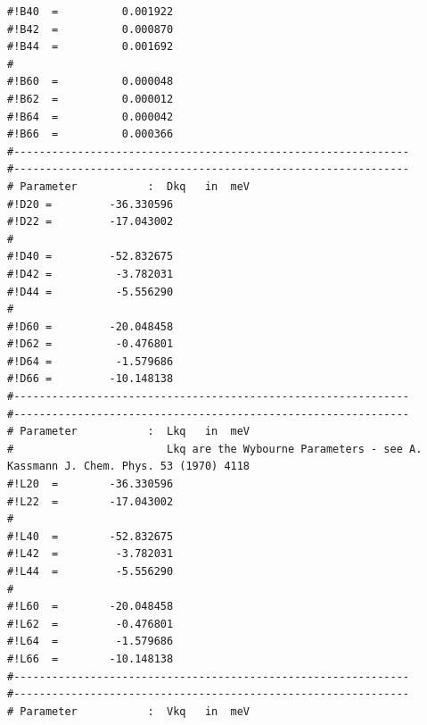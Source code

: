 \begin{enumerate}
{\begin{verbatim}
#!B40  =          0.001922                                     
#!B42  =          0.000870                                     
#!B44  =          0.001692                                     
#                                                              
#!B60  =          0.000048                                     
#!B62  =          0.000012                                     
#!B64  =          0.000042                                     
#!B66  =          0.000366                                     
#-------------------------------------------------------------- 
#-------------------------------------------------------------- 
# Parameter           :  Dkq   in  meV                           
#!D20 =         -36.330596                                     
#!D22 =         -17.043002                                     
#                                                              
#!D40 =         -52.832675                                     
#!D42 =          -3.782031                                     
#!D44 =          -5.556290                                     
#                                                              
#!D60 =         -20.048458                                     
#!D62 =          -0.476801                                     
#!D64 =          -1.579686                                     
#!D66 =         -10.148138                                     
#-------------------------------------------------------------- 
#-------------------------------------------------------------- 
# Parameter           :  Lkq   in  meV                           
#                        Lkq are the Wybourne Parameters - see A. Kassmann J. Chem. Phys. 53 (1970) 4118
#!L20  =        -36.330596                                     
#!L22  =        -17.043002                                     
#                                                              
#!L40  =        -52.832675                                     
#!L42  =         -3.782031                                     
#!L44  =         -5.556290                                     
#                                                              
#!L60  =        -20.048458                                     
#!L62  =         -0.476801                                     
#!L64  =         -1.579686                                     
#!L66  =        -10.148138                                     
#-------------------------------------------------------------- 
#-------------------------------------------------------------- 
# Parameter           :  Vkq   in  meV                           

\end{verbatim}}
\end{enumerate}
